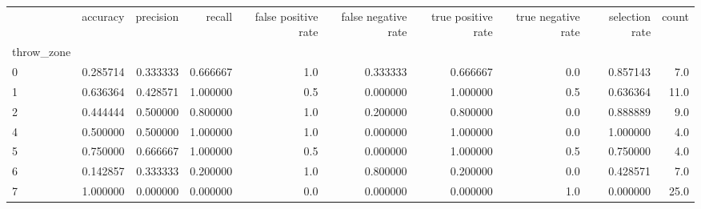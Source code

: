 \begin{tabular}{lrrrrrrrrr}
\toprule
{} &  accuracy &  precision &    recall &  false positive rate &  false negative rate &  true positive rate &  true negative rate &  selection rate &  count \\
throw\_zone &           &            &           &                      &                      &                     &                     &                 &        \\
\midrule
0          &  0.285714 &   0.333333 &  0.666667 &                  1.0 &             0.333333 &            0.666667 &                 0.0 &        0.857143 &    7.0 \\
1          &  0.636364 &   0.428571 &  1.000000 &                  0.5 &             0.000000 &            1.000000 &                 0.5 &        0.636364 &   11.0 \\
2          &  0.444444 &   0.500000 &  0.800000 &                  1.0 &             0.200000 &            0.800000 &                 0.0 &        0.888889 &    9.0 \\
4          &  0.500000 &   0.500000 &  1.000000 &                  1.0 &             0.000000 &            1.000000 &                 0.0 &        1.000000 &    4.0 \\
5          &  0.750000 &   0.666667 &  1.000000 &                  0.5 &             0.000000 &            1.000000 &                 0.5 &        0.750000 &    4.0 \\
6          &  0.142857 &   0.333333 &  0.200000 &                  1.0 &             0.800000 &            0.200000 &                 0.0 &        0.428571 &    7.0 \\
7          &  1.000000 &   0.000000 &  0.000000 &                  0.0 &             0.000000 &            0.000000 &                 1.0 &        0.000000 &   25.0 \\
\bottomrule
\end{tabular}
